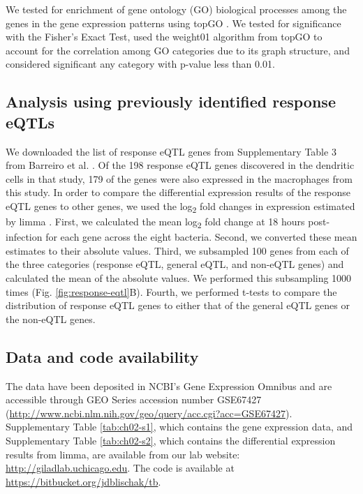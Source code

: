We tested for enrichment of gene ontology (GO) biological processes
among the genes in the gene expression patterns using topGO
\citep{Alexa2006}. We tested for significance with the Fisher's Exact
Test, used the weight01 algorithm from topGO to account for the
correlation among GO categories due to its graph structure, and
considered significant any category with p-value less than 0.01.

\subsection{Analysis using previously identified response
eQTLs}\label{analysis-using-previously-identified-response-eqtls}

We downloaded the list of response eQTL genes from Supplementary Table 3
from Barreiro et al. \citep{Barreiro2012}. Of the 198 response eQTL genes
discovered in the dendritic cells in that study, 179 of the genes were
also expressed in the macrophages from this study. In order to compare
the differential expression results of the response eQTL genes to other
genes, we used the log\textsubscript{2} fold changes in expression
estimated by limma \citep{Ritchie2015}. First, we calculated the mean
log\textsubscript{2} fold change at 18 hours post-infection for each
gene across the eight bacteria. Second, we converted these mean
estimates to their absolute values. Third, we subsampled 100 genes from
each of the three categories (response eQTL, general eQTL, and non-eQTL
genes) and calculated the mean of the absolute values. We performed this
subsampling 1000 times (Fig. \ref{fig:response-eqtl}B). Fourth, we performed t-tests to
compare the distribution of response eQTL genes to either that of the
general eQTL genes or the non-eQTL genes.

\subsection{Data and code
availability}\label{ch02-data-and-code-availability}

The data have been deposited in NCBI's Gene Expression Omnibus
\citep{Edgar2002} and are accessible through GEO Series accession number
GSE67427 (\url{http://www.ncbi.nlm.nih.gov/geo/query/acc.cgi?acc=GSE67427}).
Supplementary Table \ref{tab:ch02-s1}, which contains the gene expression data, and
Supplementary Table \ref{tab:ch02-s2}, which contains the differential expression
results from limma, are available from our lab website:
\url{http://giladlab.uchicago.edu}. The code is available at
\url{https://bitbucket.org/jdblischak/tb}.

